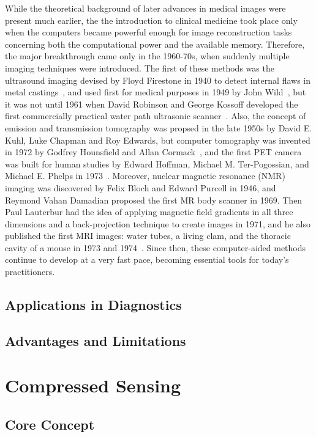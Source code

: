 While the theoretical background of later advances in medical images were present much earlier, the the introduction to clinical medicine took place only when the computers became powerful enough for image reconstruction tasks concerning both the computational power and the available memory. Therefore, the major breakthrough came only in the 1960-70s, when suddenly multiple imaging techniques were introduced. The first of these methods was the ultrasound imaging devised by Floyd Firestone in 1940 to detect internal flaws in metal castings~\cite{singh_origin_2007}, and used first for medical purposes in 1949 by John Wild~\cite{watts_john_2009}, but it was not until 1961 when David Robinson and George Kossoff developed the first commercially practical water path ultrasonic scanner~\cite{griffiths_historical_nodate}. Also, the concept of emission and transmission tomography was propsed in the late 1950s by David E. Kuhl, Luke Chapman and Roy Edwards, but computer tomography was invented in 1972 by Godfrey Hounsfield and Allan Cormack~\cite{richmond_sir_2004}, and the first PET camera was built for human studies by Edward Hoffman, Michael M. Ter-Pogossian, and Michael E. Phelps in 1973~\cite{noauthor_us_nodate}. Moreover, nuclear magnetic resonance (NMR) imaging was discovered by Felix Bloch and Edward Purcell in 1946, and Reymond Vahan Damadian proposed the first MR body scanner in 1969. Then Paul Lauterbur had the idea of applying magnetic field gradients in all three dimensions and a back-projection technique to create images in 1971, and he also published the first MRI images: water tubes, a living clam, and the thoracic cavity of a mouse in 1973 and 1974~\cite{rinck_short_2008}. Since then, these computer-aided methods continue to develop at a very fast pace, becoming essential tools for today's practitioners.

\subsection{Applications in Diagnostics}

\subsection{Advantages and Limitations}

\section{Compressed Sensing}
\subsection{Core Concept}

